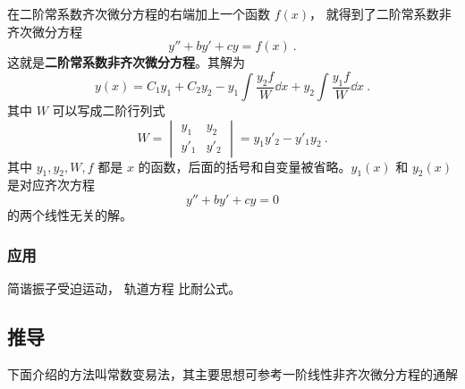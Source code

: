 


在二阶常系数齐次微分方程的右端加上一个函数 $f(x)$， 就得到了二阶常系数非齐次微分方程
\begin{equation}\label{eq_Ode2N_1}
y'' + by' + cy = f(x)~.
\end{equation}
这就是\textbf{二阶常系数非齐次微分方程}。其解为
\begin{equation}
y(x) = C_1 y_1 + C_2 y_2 - y_1\int \frac{y_2 f}{W} \dd{x} + y_2\int \frac{y_1 f}{W} \dd{x}~.
\end{equation}
其中 $W$ 可以写成二阶行列式
\begin{equation}
W = 
\begin{vmatrix}
y_1 & y_2\\
y'_1 & y'_2
\end{vmatrix} = y_1 y'_2 - y'_1 y_2~.
\end{equation}
其中 $y_1, y_2, W, f$ 都是 $x$ 的函数，后面的括号和自变量被省略。$y_1(x)$ 和 $y_2(x)$ 是对应齐次方程 
\begin{equation}\label{eq_Ode2N_4}
y'' + by' + cy = 0
\end{equation}
的两个线性无关的解。

\subsubsection{应用}
简谐振子受迫运动， 轨道方程 比耐公式。

\subsection{推导}

下面介绍的方法叫常数变易法，其主要思想可参考一阶线性非齐次微分方程的通解%

